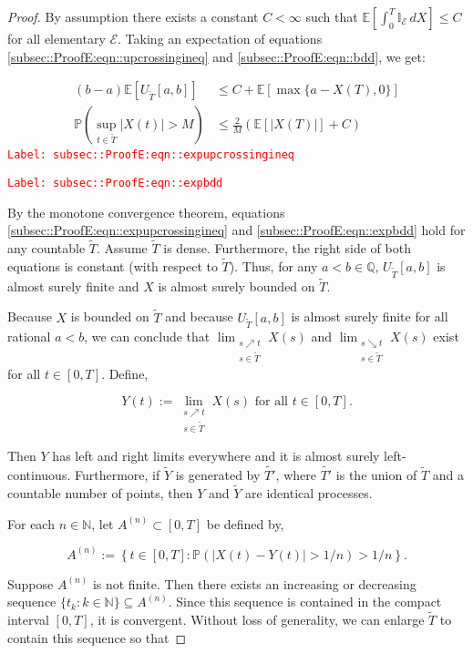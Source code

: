 \documentclass[12pt]{article}
\newcommand{\mb}{\mathbb}
\newcommand{\mc}{\mathcal}
\newcommand{\te}{\text}
\newcommand{\tr}{\textcolor{red}}
\newcommand{\labe}[1]{\tr{\texttt{Label: #1}}}
\newcommand{\ind}{\hspace{24pt}}
\newcommand{\pr}{\mb{P}}							%
\newcommand{\ex}[1]{\mb{E}\left[#1\right]}			%
\newcommand{\T}{T}								%
\renewcommand{\t}{t}							%
\renewcommand{\tt}{s}							%
\newcommand{\X}{X}								%
\newcommand{\tp}[1]{(#1)}						%
\newcommand{\const}{C}							%
\newcommand{\sln}[1]{^{(#1)}}					%
\newcommand{\alt}[1]{\widetilde{#1}}			%
\newcommand{\indx}[1]{_{#1}}					%
\newcommand{\XX}{Y}								%
\renewcommand{\it}{k}							%
\newcommand{\evnt}{\mc{E}}						%
\newcommand{\Tset}{\alt{T}}						%
\newcommand{\typset}{A}							%
\newcommand{\upcrs}{U}							%
\newcommand{\gidd}[1]{_{#1}}					%
\begin{document}
\begin{proof}
By assumption there exists a constant \(\const < \infty\) such that \(\ex{\int_0^\T \mb{I}_{\evnt}\,d\X} \leq \const\) for all elementary \(\evnt\). Taking an expectation of equations \eqref{subsec::ProofE:eqn::upcrossingineq} and \eqref{subsec::ProofE:eqn::bdd}, we get:

\begin{align}
(b-a)\ex{\upcrs\gidd{\Tset}[a,b]} &\leq \const + \ex{\max\{a-\X\tp{\T},0\}}
\label{subsec::ProofE:eqn::expupcrossingineq}\\
\pr\left(\sup_{\t\in\Tset} |\X\tp{\t}| > M\right) &\leq \frac{2}{M}\left(\ex{|\X\tp{\T}|} + \const\right)
\label{subsec::ProofE:eqn::expbdd}
\end{align}
\labe{subsec::ProofE:eqn::expupcrossingineq}

\labe{subsec::ProofE:eqn::expbdd}

By the monotone convergence theorem, equations \eqref{subsec::ProofE:eqn::expupcrossingineq} and \eqref{subsec::ProofE:eqn::expbdd} hold for any countable \(\Tset\). Assume \(\Tset\) is dense. Furthermore, the right side of both equations is constant (with respect to \(\Tset\)). Thus, for any \(a < b \in \mb{Q}\), \(\upcrs\gidd{\Tset}[a,b]\) is almost surely finite and \(\X\) is almost surely bounded on \(\Tset\).

\ind Because \(\X\) is bounded on \(\Tset\) and because \(\upcrs\gidd{\Tset}[a,b]\) is almost surely finite for all rational \(a < b\), we can conclude that \(\lim_{\substack{\tt \nearrow \t\\ \tt \in \Tset}} \X\tp{\tt}\) and \(\lim_{\substack{\tt \searrow \t\\ \tt \in \Tset}} \X\tp{\tt}\) exist for all \(\t \in [0,\T]\). Define,

\[\XX\tp{\t} := \lim_{\substack{\tt \nearrow \t\\\tt \in \Tset}} \X\tp{\tt}\te{ for all } \t \in [0,\T].\]

Then \(\XX\) has left and right limits everywhere and it is almost surely left-continuous. Furthermore, if \(\alt{\XX}\) is generated by \(\alt{T'}\), where \(\alt{T'}\) is the union of \(\Tset\) and a countable number of points, then \(\XX\) and \(\alt{\XX}\) are identical processes. 

\ind For each \(n \in \mb{N}\), let \(\typset\sln{n} \subset [0,\T]\) be defined by,

\[\typset\sln{n} := \left\{\t\in [0,\T]: \pr\left(|\X\tp{\t} - \XX\tp{\t}| > 1/n\right) > 1/n\right\}.\] 

Suppose \(\typset\sln{n}\) is not finite. Then there exists an increasing or decreasing sequence \(\{\t\indx{\it}:\it\in \mb{N}\}\subseteq \typset\sln{n}\). Since this sequence is contained in the compact interval \([0,\T]\), it is convergent. Without loss of generality, we can enlarge \(\Tset\) to contain this sequence so that


\end{proof}
\end{document}

